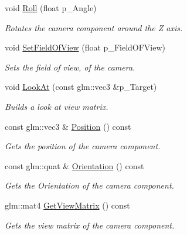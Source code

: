 \begin{DoxyCompactItemize}
void \mbox{\hyperlink{class_camera_component_acac54caedcd622f9c7e0b032ff6d3ec5}{Roll}} (float p\+\_\+\+Angle)
\begin{DoxyCompactList}\small\item\em Rotates the camera component around the Z axis. \end{DoxyCompactList}\item 
void \mbox{\hyperlink{class_camera_component_aea9b41ddab22a442fb1abc90008a406e}{Set\+Field\+Of\+View}} (float p\+\_\+\+Field\+O\+F\+View)
\begin{DoxyCompactList}\small\item\em Sets the field of view, of the camera. \end{DoxyCompactList}\item 
void \mbox{\hyperlink{class_camera_component_a4c4afaba244a809c07db05e9ec958a5d}{Look\+At}} (const glm\+::vec3 \&p\+\_\+\+Target)
\begin{DoxyCompactList}\small\item\em Builds a look at view matrix. \end{DoxyCompactList}\item 
const glm\+::vec3 \& \mbox{\hyperlink{class_camera_component_ada9efd239599d32ad9ec5fa92c26c38c}{Position}} () const
\begin{DoxyCompactList}\small\item\em Gets the position of the camera component. \end{DoxyCompactList}\item 
const glm\+::quat \& \mbox{\hyperlink{class_camera_component_ab87523de9e8a9070e69c852e0cae4493}{Orientation}} () const
\begin{DoxyCompactList}\small\item\em Gets the Orientation of the camera component. \end{DoxyCompactList}\item 
glm\+::mat4 \mbox{\hyperlink{class_camera_component_a7304926c3974f8a80e3fc0a6c5e49cd1}{Get\+View\+Matrix}} () const
\begin{DoxyCompactList}\small\item\em Gets the view matrix of the camera component. \end{DoxyCompactList}\end{DoxyCompactItemize}
